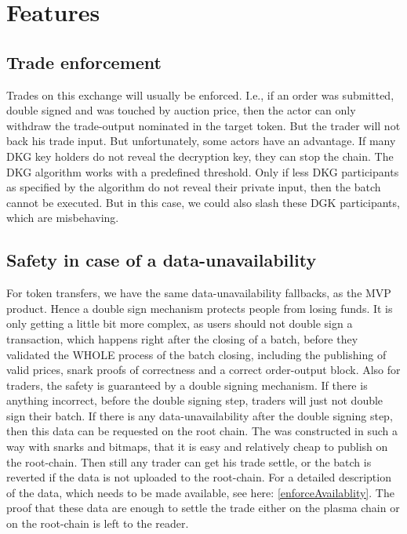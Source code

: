 \documentclass[11pt,parskip=full]{scrartcl}%
\begin{document}
\newpage
\section{Features}

\subsection{Trade enforcement}
Trades on this exchange will usually be enforced. I.e., if an order was submitted, double signed and was touched by auction price, then the actor can only withdraw the trade-output nominated in the target token. But the trader will not back his trade input. \newline 
But unfortunately, some actors have an advantage. If many DKG key holders do not reveal the decryption key, they can stop the chain. The DKG algorithm works with a predefined threshold. Only if less DKG participants as specified by the algorithm do not reveal their private input, then the batch cannot be executed. But in this case, we could also slash these DGK participants, which are misbehaving.

\subsection{Safety in case of a data-unavailability}
For token transfers, we have the same data-unavailability fallbacks, as the MVP product. Hence a double sign mechanism protects people from losing funds. It is only getting a little bit more complex, as users should not double sign a transaction, which happens right after the closing of a batch, before they validated the WHOLE process of the batch closing, including the publishing of valid prices, snark proofs of correctness and a correct order-output block.
Also for traders, the safety is guaranteed by a  double signing mechanism. If there is anything incorrect, before the double signing step, traders will just not double sign their batch.
If there is any data-unavailability after the double signing step, then this data can be requested on the root chain. The was constructed in such a way with snarks and bitmaps, that it is easy and relatively cheap to publish on the root-chain. Then still any trader can get his trade settle, or the batch is reverted if the data is not uploaded to the root-chain. For a detailed description of the data, which needs to be made available, see here: \ref{enforceAvailablity}. The proof that these data are enough to settle the trade either on the plasma chain or on the root-chain is left to the reader.  
\end{document}
